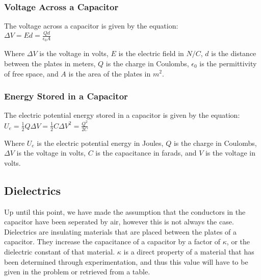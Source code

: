 \subsubsection*{Voltage Across a Capacitor}

\hspace{.5cm} The voltage across a capacitor is given by the equation:\\

\vbox {
    \large\center
    $\Delta V = Ed = \frac{Qd}{\epsilon_0 A}$
}
\vspace{12pt}

Where $\Delta V$ is the voltage in volts, $E$ is the electric field in $N/C$, $d$ is the distance between the plates in meters, $Q$ is the charge in Coulombs, $\epsilon_0$ is the permittivity of free space, and $A$ is the area of the plates in $m^2$.\\


\subsubsection*{Energy Stored in a Capacitor}
\hspace{.5cm} The electric potential energy stored in a capacitor is given by the equation:\\
\vbox {
    \large\center
    $U_e = \frac{1}{2}Q\Delta V = \frac{1}{2}C\Delta V^2 = \frac{Q^2}{2C}$
}
\vspace{12pt}

Where $U_e$ is the electric potential energy in Joules, $Q$ is the charge in Coulombs, $\Delta V$ is the voltage in volts, $C$ is the capacitance in farads, and $V$ is the voltage in volts.\\

\vspace{12pt}
\hrulefill

\begin{center}
    \subsection*{Dielectrics}
\end{center}

\hspace{.5cm} Up until this point, we have made the assumption that the conductors in the capacitor have been seperated by air, however this is not always the case. Dielectrics are insulating materials that are placed between the plates of a capacitor. 
They increase the capacitance of a capacitor by a factor of $\kappa$, or the dielectric constant of that material. $\kappa$ is a direct property of a material that has been determined through experimentation, and thus this value will have to be given
in the problem or retrieved from a table.\\
\pagebreak

